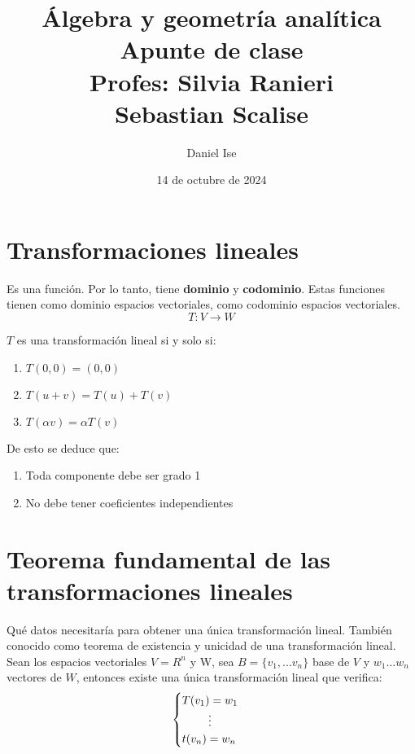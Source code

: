 \documentclass[12pt]{article}
\title{Álgebra y geometría analítica\\Apunte de clase
\\Profes: Silvia Ranieri\\Sebastian Scalise}
\author{Daniel Ise}
\date{14 de octubre de 2024}
\begin{document}
\maketitle

\tableofcontents

\section{Transformaciones lineales}

Es una función.
Por lo tanto,
tiene \textbf{dominio} y \textbf{codominio}.
Estas funciones tienen como dominio espacios vectoriales,
como codominio espacios vectoriales.
\begin{equation}
    T: V \rightarrow W
\end{equation}

\(T\) es una transformación lineal si y solo si:
\begin{enumerate}
    \item \(T(0,0) = (0,0)\)
    \item \(T(u + v) = T(u) + T(v)\)
    \item \(T(\alpha v) = \alpha T(v)\)
\end{enumerate}

De esto se deduce que:
\begin{enumerate}
    \item Toda componente debe ser grado 1
    \item No debe tener coeficientes independientes
\end{enumerate}

\section{Teorema fundamental de las transformaciones lineales}

Qué datos necesitaría para obtener una única transformación lineal.
También conocido como teorema de existencia y unicidad de 
una transformación lineal.
Sean los espacios vectoriales \(V = R^{n}\) y W, sea \(B = \{v_{1}, ... v_{n}\}\)
base de \(V\) y \(w_{1} \dots w_{n}\) vectores de \(W\), entonces existe 
una única transformación lineal que verifica:
\begin{align}
    \begin{cases}
        T(v_{1}) = w_{1}  \\
        \hfil \vdots      \\
        t(v_{n}) = w_{n}  \\
    \end{cases}
\end{align}
\end{document}
